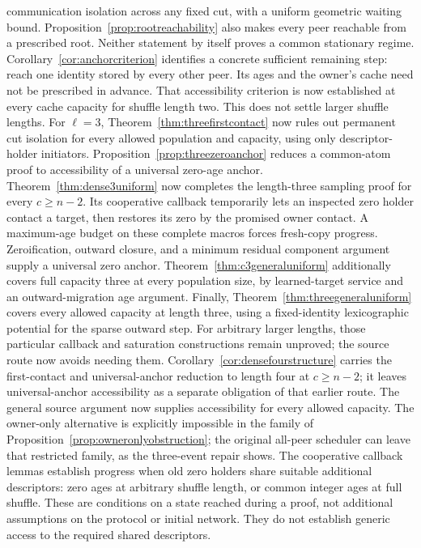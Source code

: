\documentclass[11pt]{article}
\begin{document}
communication isolation across any fixed cut, with a uniform
geometric waiting bound. Proposition~\ref{prop:rootreachability}
also makes every peer reachable from a prescribed root.
Neither statement by itself proves a common stationary
regime. Corollary~\ref{cor:anchorcriterion} identifies a
concrete sufficient remaining step: reach one identity
stored by every other peer. Its ages and the owner's
cache need not be prescribed in advance. That accessibility
criterion is now established at every cache capacity
for shuffle length two. This does not settle larger
shuffle lengths.
For $\ell=3$, Theorem~\ref{thm:threefirstcontact} now
rules out permanent cut isolation for every allowed
population and capacity, using only descriptor-holder
initiators. Proposition~\ref{prop:threezeroanchor}
reduces a common-atom proof to accessibility
of a universal zero-age anchor.
Theorem~\ref{thm:dense3uniform} now completes the
length-three sampling proof for every $c\ge n-2$.
Its cooperative callback temporarily lets an inspected
zero holder contact a target, then restores its zero
by the promised owner contact. A maximum-age budget
on these complete macros forces fresh-copy progress.
Zeroification, outward closure, and a minimum residual
component argument supply a universal zero anchor.
Theorem~\ref{thm:c3generaluniform} additionally covers full
capacity three at every population size, by learned-target
service and an outward-migration age argument. Finally,
Theorem~\ref{thm:threegeneraluniform} covers every allowed
capacity at length three, using a fixed-identity lexicographic
potential for the sparse outward step.
For arbitrary larger lengths, those particular callback
and saturation constructions remain unproved; the source route
now avoids needing them.
Corollary~\ref{cor:densefourstructure} carries the
first-contact and universal-anchor reduction to length
four at $c\ge n-2$; it leaves universal-anchor accessibility
as a separate obligation of that earlier route. The general source
argument now supplies accessibility for every allowed capacity.
The owner-only alternative is explicitly impossible
in the family of Proposition~\ref{prop:owneronlyobstruction};
the original all-peer scheduler can leave that
restricted family, as the three-event repair shows.
The cooperative callback lemmas establish progress
when old zero holders share suitable additional
descriptors: zero ages at arbitrary shuffle length,
or common integer ages at full shuffle. These are
conditions on a state reached during a proof, not
additional assumptions on the protocol or initial
network. They do not establish generic access to
the required shared descriptors.
\end{document}
